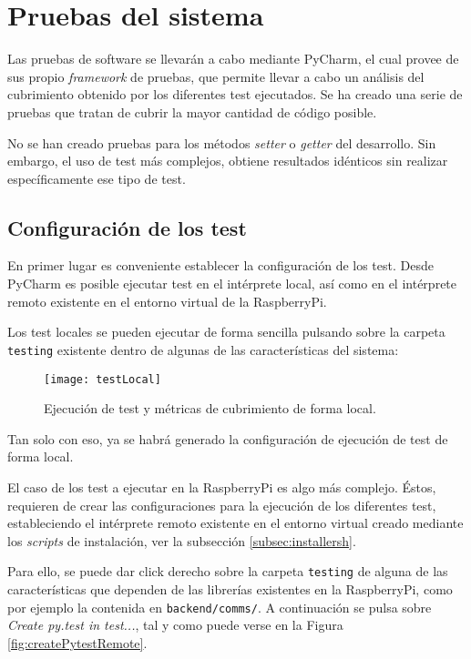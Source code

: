 \section{Pruebas del sistema}

Las pruebas de software se llevarán a cabo mediante PyCharm, el cual provee de sus propio \emph{framework} de pruebas, que permite llevar a cabo un análisis del cubrimiento obtenido por los diferentes test ejecutados. Se ha creado una serie de pruebas que tratan de cubrir la mayor cantidad de código posible. 

No se han creado pruebas para los métodos \emph{setter} o \emph{getter} del desarrollo. Sin embargo, el uso de test más complejos, obtiene resultados idénticos sin realizar específicamente ese tipo de test. 


\subsection{Configuración de los test}
\label{subsec:configtest}
En primer lugar es conveniente establecer la configuración de los test. Desde PyCharm es posible ejecutar test en el intérprete local, así como en el intérprete remoto existente en el entorno virtual de la RaspberryPi. 

Los test locales se pueden ejecutar de forma sencilla pulsando sobre la carpeta \texttt{testing} existente dentro de algunas de las características del sistema: 


\begin{figure}[H]
	\centering
	\texttt{[image: testLocal]}
	\caption[Ejecución de test en intérprete local]{Ejecución de test y métricas de cubrimiento de forma local.}\label{fig:testLocal}
\end{figure}

Tan solo con eso, ya se habrá generado la configuración de ejecución de test de forma local. 

El caso de los test a ejecutar en la RaspberryPi es algo más complejo. Éstos, requieren de crear las configuraciones para la ejecución de los diferentes test, estableciendo el intérprete remoto existente en el entorno virtual creado mediante los \emph{scripts} de instalación, ver la subsección \ref{subsec:installersh}.

Para ello, se puede dar click derecho sobre la carpeta \texttt{testing} de alguna de las características que dependen de las librerías existentes en la RaspberryPi, como por ejemplo la contenida en \texttt{backend/comms/}. 
A continuación se pulsa sobre \emph{Create py.test in test...}, tal y como puede verse en la Figura \ref{fig:createPytestRemote}.

